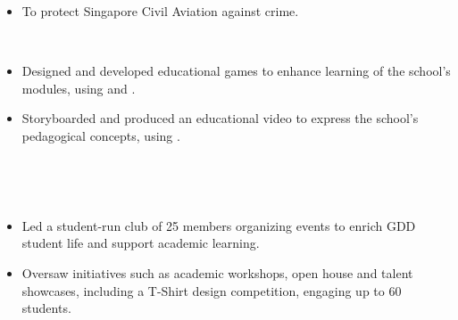 \documentclass[a4paper,10pt]{article}
\begin{document}
\begin{center}
\begin{minipage}{1\textwidth}
      \vspace{0.15cm}

      \begin{itemize}[left=0pt, labelsep=0.5em, itemsep=0pt, topsep=0pt, parsep=0pt, partopsep=0pt]
        \item \small\lato To protect Singapore Civil Aviation against crime.
      \end{itemize}

      \vspace{0.25cm}

      \noindent
      \hfill
      \\

      \vspace{0.15cm}

      \begin{itemize}[left=0pt, labelsep=0.5em, itemsep=0pt, topsep=0pt, parsep=0pt, partopsep=0pt]
        \item \small\lato Designed and developed educational games to enhance learning of the school's modules, using  \lato and .
        \item \small\lato Storyboarded and produced an educational video to express the school's pedagogical concepts, using .\\
      \end{itemize}

      \normalsize\noindent{}\\[-0.25cm]
      \makebox[\linewidth]{\rule{1.02\linewidth}{0.3pt}}

      \noindent
      \hfill
      \\

      \vspace{0.15cm}

      \begin{itemize}[left=0pt, labelsep=0.5em, itemsep=0pt, topsep=0pt, parsep=0pt, partopsep=0pt]
        \item \small\lato Led a student-run club of 25 members organizing events to enrich GDD student life and support academic learning.      
        \item \small\lato Oversaw initiatives such as academic workshops, open house and talent showcases, including a T-Shirt design competition, engaging up to 60 students.
      \end{itemize}


\end{minipage}
\end{center}
\end{document}
